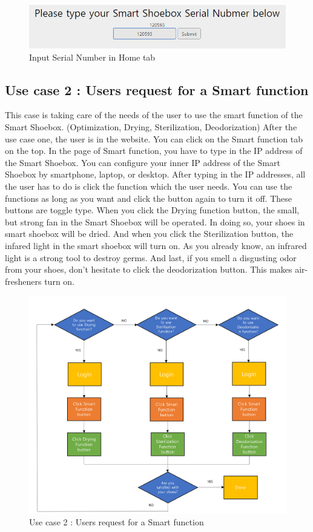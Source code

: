 \documentclass[conference]{IEEEtran}
\begin{document}
\begin{figure}[H]
\begin{center}
    \includegraphics[scale=0.4]{jh0}
     \caption{Input Serial Number in Home tab}\label{fig:label}
\end{center}
\end{figure}

\subsection{Use case 2 : Users request for a Smart function} This case is taking care of the needs of the user to use the smart function of the Smart Shoebox. (Optimization, Drying, Sterilization, Deodorization) After the use case one, the user is in the website. You can click on the Smart function tab on the top. In the page of Smart function, you have to type in the IP address of the Smart Shoebox. You can configure your inner IP address of the Smart Shoebox by smartphone, laptop, or desktop. After typing in the IP addresses, all the user has to do is click the function which the user needs. You can use the functions as long as you want and click the button again to turn it off. These buttons are toggle type. When you click the Drying function button, the small, but strong fan in the Smart Shoebox will be operated. In doing so, your shoes in smart shoebox will be dried. And when you click the Sterilization button, the infared light in the smart shoebox will turn on. As you already know, an infrared light is a strong tool to destroy germs. And last, if you smell a disgusting odor from your shoes, don't hesitate to click the deodorization button. This makes air-fresheners turn on.
\begin{figure}[H]
\begin{center}
    \includegraphics[scale=0.3]{usecase2}
    \caption{Use case 2 : Users request for a Smart function} \label{fig:label}
\end{center}
\end{figure}
\end{document}
